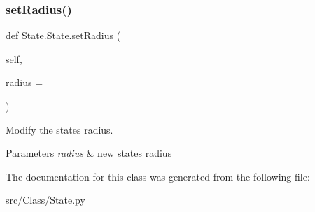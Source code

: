 \subsubsection{\texorpdfstring{setRadius()}{setRadius()}}
{\footnotesize\ttfamily def State.\+State.\+set\+Radius (\begin{DoxyParamCaption}\item[{}]{self,  }\item[{}]{radius = {} }\end{DoxyParamCaption})}



Modify the state\textquotesingle{}s radius. 


\begin{DoxyParams}{Parameters}
{\em radius} & new state\textquotesingle{}s radius \\
\hline
\end{DoxyParams}


The documentation for this class was generated from the following file\+:\begin{DoxyCompactItemize}
\item 
src/\+Class/State.\+py\end{DoxyCompactItemize}
